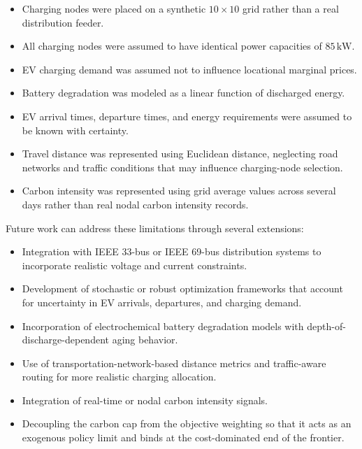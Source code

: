\documentclass[sustainability,article,submit,moreauthors,pdftex]{Definitions/mdpi}
\begin{document}
\begin{itemize}

\item Charging nodes were placed on a synthetic $10 \times 10$ grid rather than a real distribution feeder.

\item All charging nodes were assumed to have identical power capacities of $85\,\text{kW}$.

\item EV charging demand was assumed not to influence locational marginal prices.

\item Battery degradation was modeled as a linear function of discharged energy.

\item EV arrival times, departure times, and energy requirements were assumed to be known with certainty.

\item Travel distance was represented using Euclidean distance, neglecting road networks and traffic conditions that may influence charging-node selection.

\item Carbon intensity was represented using grid average values across several days rather than real nodal carbon intensity records.

\end{itemize}

Future work can address these limitations through several extensions:

\begin{itemize}

\item Integration with IEEE 33-bus or IEEE 69-bus distribution systems to incorporate realistic voltage and current constraints.

\item Development of stochastic or robust optimization frameworks that account for uncertainty in EV arrivals, departures, and charging demand.

\item Incorporation of electrochemical battery degradation models with depth-of-discharge-dependent aging behavior.

\item Use of transportation-network-based distance metrics and traffic-aware routing for more realistic charging allocation.

\item Integration of real-time or nodal carbon intensity signals.

\item Decoupling the carbon cap from the objective weighting so that it acts as an exogenous policy limit and binds at the cost-dominated end of the frontier.

\end{itemize}
\end{document}
